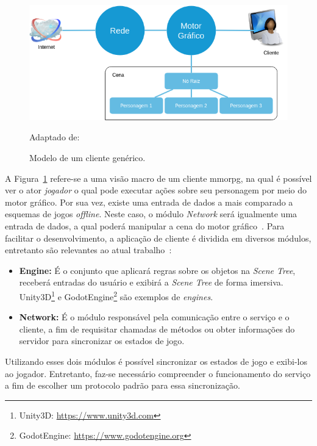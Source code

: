 \begin{figure}[htb!]
\caption{Modelo de um cliente genérico.}
\label{fig:gateway}
\includegraphics[width=\textwidth]{img/cap2/cliente.png}
\centering

Adaptado de:~\cite{507915, faber}
\end{figure}


A Figura~\ref{fig:gateway} refere-se a uma visão macro de um cliente \ac{mmorpg}, na qual é possível ver o ator \textit{jogador} o qual pode executar ações sobre seu personagem por meio do motor gráfico.
%
Por sua vez, existe uma entrada de dados a mais comparado a esquemas de jogos \textit{offline}.
%
Neste caso, o módulo \textit{Network} será igualmente uma entrada de dados, a qual poderá manipular a cena do motor gráfico~\cite{faber}.
%
Para facilitar o desenvolvimento, a aplicação de cliente é dividida em diversos módulos, entretanto são relevantes ao atual trabalho~\cite{albion_online_unite}:



\begin{itemize}
  \item \textbf{Engine:} É o conjunto que aplicará regras sobre os objetos na \textit{Scene Tree}, receberá entradas do usuário e exibirá a \textit{Scene Tree} de forma imersiva. Unity3D\footnote{Unity3D: \url{https://www.unity3d.com}} e GodotEngine\footnote{GodotEngine: \url{https://www.godotengine.org}} são exemplos de \textit{engines}.
  \item \textbf{Network:} É o módulo responsável pela comunicação entre o serviço e o cliente, a fim de requisitar chamadas de métodos ou obter informações do servidor para sincronizar os estados de jogo.
\end{itemize}



Utilizando esses dois módulos é possível sincronizar os estados de jogo e exibi-los ao jogador.
%
Entretanto, faz-se necessário compreender o funcionamento do serviço a fim de escolher um protocolo padrão para essa sincronização.




